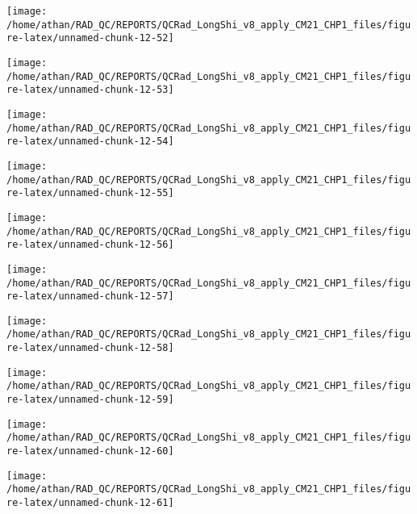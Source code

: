 \documentclass[
  10pt,
  a4paper,oneside]{article}
\begin{document}
\begin{center}\texttt{[image: /home/athan/RAD\_QC/REPORTS/QCRad\_LongShi\_v8\_apply\_CM21\_CHP1\_files/figure-latex/unnamed-chunk-12-52]} \end{center}

\begin{center}\texttt{[image: /home/athan/RAD\_QC/REPORTS/QCRad\_LongShi\_v8\_apply\_CM21\_CHP1\_files/figure-latex/unnamed-chunk-12-53]} \end{center}

\begin{center}\texttt{[image: /home/athan/RAD\_QC/REPORTS/QCRad\_LongShi\_v8\_apply\_CM21\_CHP1\_files/figure-latex/unnamed-chunk-12-54]} \end{center}

\begin{center}\texttt{[image: /home/athan/RAD\_QC/REPORTS/QCRad\_LongShi\_v8\_apply\_CM21\_CHP1\_files/figure-latex/unnamed-chunk-12-55]} \end{center}

\begin{center}\texttt{[image: /home/athan/RAD\_QC/REPORTS/QCRad\_LongShi\_v8\_apply\_CM21\_CHP1\_files/figure-latex/unnamed-chunk-12-56]} \end{center}

\begin{center}\texttt{[image: /home/athan/RAD\_QC/REPORTS/QCRad\_LongShi\_v8\_apply\_CM21\_CHP1\_files/figure-latex/unnamed-chunk-12-57]} \end{center}

\begin{center}\texttt{[image: /home/athan/RAD\_QC/REPORTS/QCRad\_LongShi\_v8\_apply\_CM21\_CHP1\_files/figure-latex/unnamed-chunk-12-58]} \end{center}

\begin{center}\texttt{[image: /home/athan/RAD\_QC/REPORTS/QCRad\_LongShi\_v8\_apply\_CM21\_CHP1\_files/figure-latex/unnamed-chunk-12-59]} \end{center}

\begin{center}\texttt{[image: /home/athan/RAD\_QC/REPORTS/QCRad\_LongShi\_v8\_apply\_CM21\_CHP1\_files/figure-latex/unnamed-chunk-12-60]} \end{center}

\begin{center}\texttt{[image: /home/athan/RAD\_QC/REPORTS/QCRad\_LongShi\_v8\_apply\_CM21\_CHP1\_files/figure-latex/unnamed-chunk-12-61]} \end{center}
\end{document}
